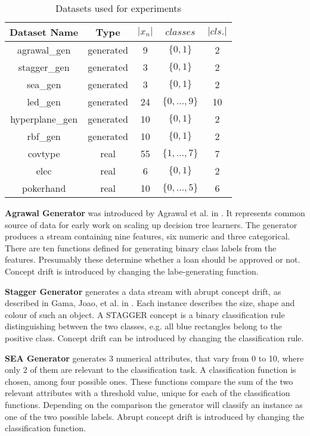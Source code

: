 \documentclass{sig-alternate-br}
\begin{document}
\begin{table}[h]
\centering
\renewcommand{\arraystretch}{1.25}
\begin{tabular}{|c|c|c|c|c|} \hline
\textbf{Dataset Name} & \textbf{Type} & \textbf{$|x_n|$} & \textbf{$classes$} & \textbf{$|cls.|$} \\ \hline
agrawal\_gen & generated & 9 & $\{0, 1\}$ & 2 \\ \hline
stagger\_gen & generated & 3 & $\{0, 1\}$ & 2 \\ \hline
sea\_gen & generated & 3 & $\{0, 1\}$ & 2 \\ \hline
led\_gen & generated & 24 & $\{0,\dots,9\}$ & 10 \\ \hline
hyperplane\_gen & generated & 10 & $\{0, 1\}$ & 2\\ \hline
rbf\_gen & generated & 10 & $\{0, 1\}$ & 2\\ \hline
covtype & real & 55 & $\{1,\dots,7\}$ & 7 \\ \hline
elec & real & 6 & $\{0, 1\}$ & 2 \\ \hline
pokerhand & real & 10 & $\{0,\dots,5\}$ & 6 \\ \hline
\end{tabular}
\caption{Datasets used for experiments}
\label{table:datasets}
\end{table}

\textbf{Agrawal Generator} was introduced by Agrawal et al. in \cite{agrawal1993database}. It represents common source of data for early work on scaling up decision tree learners. The generator produces a stream containing nine features, six numeric and three categorical. There are ten functions defined for generating binary class labels from the features. Presumably these determine whether a loan should be approved or not. Concept drift is introduced by changing the labe-generating function.

\textbf{Stagger Generator} generates a data stream with abrupt concept drift, as described in Gama, Joao, et al. in \cite{gama2004learning}. Each instance describes the size, shape and colour of such an object. A STAGGER concept is a binary classification rule distinguishing between the two classes, e.g. all blue rectangles belong to the positive class\cite{van2016massively}. Concept drift can be introduced by changing the classification rule. 

\textbf{SEA Generator} generates 3 numerical attributes, that vary from 0 to 10, where 
    only 2 of them are relevant to the classification task. A classification 
    function is chosen, among four possible ones. These functions compare 
    the sum of the two relevant attributes with a threshold value, unique 
    for each of the classification functions.\cite{street2001streaming} Depending on the comparison 
    the generator will classify an instance as one of the two possible 
    labels. Abrupt concept drift is introduced by changing the classification function.
\end{document}
